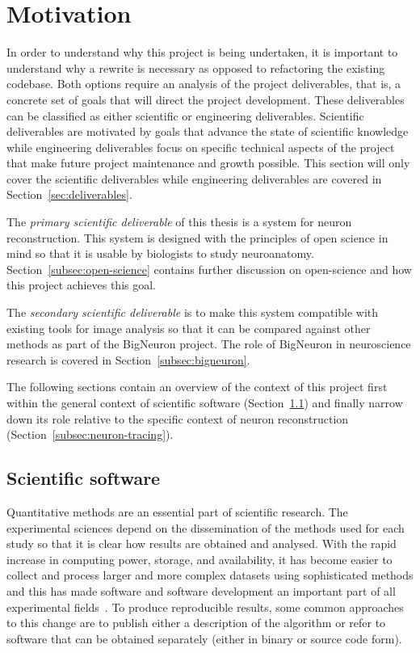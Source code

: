 \section{Motivation}

In order to understand why this project is being undertaken, it is
important to understand why a rewrite is necessary as opposed to refactoring
the existing codebase. Both options require an analysis of the project
deliverables, that is, a concrete set of goals that will direct the project
development. These deliverables can be classified as either scientific or
engineering deliverables. Scientific deliverables are motivated by goals that
advance the state of scientific knowledge while engineering deliverables focus
on specific technical aspects of the project that make future project
maintenance and growth possible. This section will only cover the scientific
deliverables while engineering deliverables are covered in Section~\ref{sec:deliverables}.

The \emph{primary scientific deliverable} of this thesis is a system for
neuron reconstruction. This system is designed with the principles of open
science in mind so that it is usable by biologists to study
neuroanatomy. Section~\ref{subsec:open-science} contains further
discussion on open-science and how this project achieves this
goal.

The \emph{secondary scientific deliverable} is to make this system
compatible with existing tools for image analysis so that it can
be compared against other methods as part of the BigNeuron
project. The role of BigNeuron in neuroscience research is covered
in Section~\ref{subsec:bigneuron}.

The following sections contain an overview of the context of this project
first within the general context of scientific software (Section~\ref{subsec:sci-soft})
and finally narrow down its role relative to the specific context
of neuron reconstruction (Section~\ref{subsec:neuron-tracing}).

\subsection{Scientific software}\label{subsec:sci-soft}
{ %
	Quantitative methods are an essential part of scientific research. The
	experimental sciences depend on the dissemination of the methods used for each
	study so that it is clear how results are obtained and analysed.
	With the rapid increase in computing power, storage, and availability,
	it has become easier to collect and process larger and more complex datasets
	using sophisticated methods and this has made software and
	software development an important part of all experimental
	fields~\citep{SSI:hettrick_2014_14809}.
	To produce reproducible results, some common approaches to this change are
	to publish either a description of the algorithm or refer to software
	that can be obtained separately (either in binary or source code form).
}

